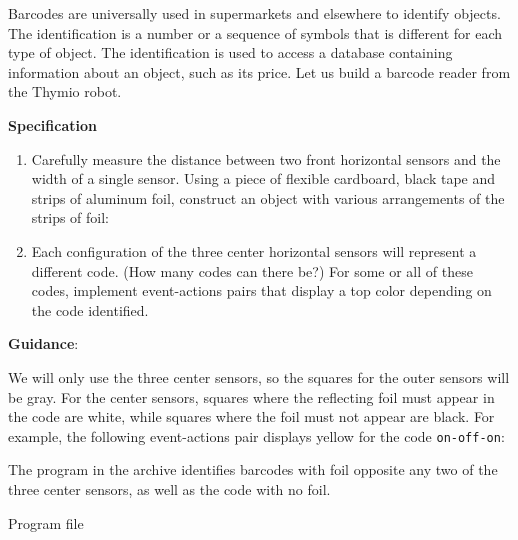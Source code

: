 \label{ch.barcode}

Barcodes are universally used in supermarkets and elsewhere to identify
objects. The identification is a number or a sequence of symbols that is
different for each type of object. The identification is used to access
a database containing information about an object, such as its price.
Let us build a barcode reader from the Thymio robot.

\textbf{Specification}

\begin{enumerate}
\item Carefully measure the distance between two front horizontal
sensors and the width of a single sensor.
Using a piece of flexible cardboard, black tape and strips of aluminum
foil, construct an object with various arrangements of the strips of foil:

\begin{center}
\end{center}

\item Each configuration of the three center horizontal sensors will
represent a different code. (How many codes can there be?) For some or
all of these codes, implement event-actions pairs that display a top
color depending on the code identified.

\end{enumerate}

\textbf{Guidance}:

We will only use the three center sensors, so the squares for the
outer sensors will be gray. For the center sensors, squares where the
reflecting foil must appear in the code are white, while squares where
the foil must not appear are black. For example, the following
event-actions pair displays yellow for the code \texttt{on-off-on}:


The program in the archive identifies barcodes with foil opposite any
two of the three center sensors, as well as the code with no foil.

{\raggedleft \hfill Program file }
